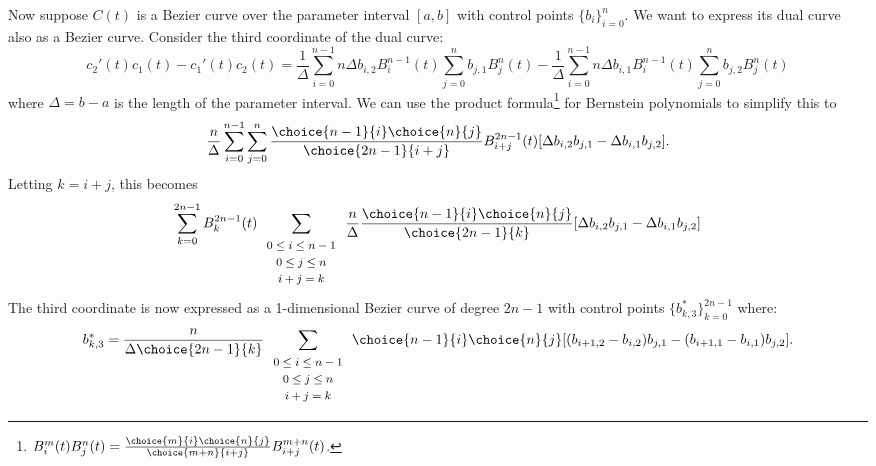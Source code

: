 \documentclass[11pt]{article}
\begin{document}
Now suppose $C(t)$ is a Bezier curve over the parameter interval $[a,b]$ with control points $\{ b_i \}_{i=0}^n$.
We want to express its dual curve also as a Bezier curve.
Consider the third coordinate of the dual curve:
\[
c_2'(t) c_1(t) - c_1'(t) c_2(t) 
=  \frac{1}{\Delta} \sum_{i=0}^{n-1} n \Delta b_{i,2} B_i^{n-1}(t) 
   		    \sum_{j=0}^n              b_{j,1} B_j^n(t) 
  - 
   \frac{1}{\Delta} \sum_{i=0}^{n-1} n \Delta b_{i,1} B_i^{n-1}(t) 
		    \sum_{j=0}^n	      b_{j,2} B_j^n(t) 
\]
where $\Delta = b-a$ is the length of the parameter interval.
We can use the product 
formula\footnote{$B_i^m(t) B_j^n(t) = \frac{ \choice{m}{i} \choice{n}{j} }{ \choice{m+n}{i+j} } B_{i+j}^{m+n}(t)$.}
for Bernstein polynomials \cite{farin97} to simplify this to
\[
  \frac{n}{\Delta} \sum_{i=0}^{n-1} \sum_{j=0}^n 
  \frac{\choice{n-1}{i} \choice{n}{j}}{ \choice{2n-1}{i+j} } B_{i+j}^{2n-1}(t)
  [ \Delta b_{i,2} b_{j,1} - \Delta b_{i,1} b_{j,2} ].
\]
Letting $k=i+j$, this becomes
\[
\sum_{k=0}^{2n-1} B_k^{2n-1}(t) 
\sum_{\begin{array}{c} \mbox{\footnotesize{$0 \leq i \leq n-1$}} \\ 
			     \mbox{\footnotesize{$0 \leq j \leq n$}} \\ 
			     \mbox{\footnotesize{$i+j=k$}}
			     \end{array}}
\frac{n}{\Delta} \frac{ \choice{n-1}{i} \choice{n}{j} }{ \choice{2n-1}{k} }
[ \Delta b_{i,2} b_{j,1} - \Delta b_{i,1} b_{j,2} ]
\]
The third coordinate is now expressed as a 1-dimensional Bezier curve of 
degree $2n-1$ with control points $\{b^*_{k,3} \}_{k=0}^{2n-1}$ where:
\begin{equation}
\label{eq:dualw2}
b^*_{k,3} = \frac{n}{\Delta \choice{2n-1}{k}}
\sum_{\begin{array}{c} \mbox{\footnotesize{$0 \leq i \leq n-1$}} \\ 
			     \mbox{\footnotesize{$0 \leq j \leq n$}} \\ 
			     \mbox{\footnotesize{$i+j=k$}}
			     \end{array}}
\choice{n-1}{i} \choice{n}{j}
[ (b_{i+1,2} - b_{i,2}) b_{j,1} - (b_{i+1,1} - b_{i,1}) b_{j,2} ].
\end{equation}
\end{document}
